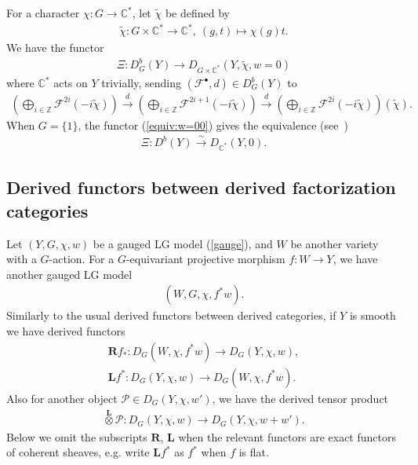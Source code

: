 \documentclass[11pt]{amsart}
\theoremstyle{plain}
\newcommand{\fF}{\mathcal{F}}
\newcommand{\pP}{\mathcal{P}}
\newcommand{\dotimes}{\stackrel{\textbf{L}}{\otimes}}
\newcommand{\dR}{\mathbf{R}}
\newcommand{\dL}{\mathbf{L}}
\begin{document}
For a character $\chi \colon G \to \mathbb{C}^{\ast}$, let 
$\widetilde{\chi}$ be defined by
\begin{align*}
\widetilde{\chi} \colon G \times \mathbb{C}^{\ast} \to \mathbb{C}^{\ast}, \ 
(g, t) \mapsto \chi(g)t.
\end{align*}
We have the functor
\begin{align}\label{equiv:w=00}
\Xi \colon
D_G^b(Y) \to D_{G\times \mathbb{C}^{\ast}}(Y, \widetilde{\chi}, w=0)
\end{align}
where $\mathbb{C}^{\ast}$ acts on $Y$ trivially, 
sending $(\fF^{\bullet}, d) \in D_G^b(Y)$ to 
\begin{align*}
\left(\bigoplus_{i\in \mathbb{Z}}
\fF^{2i}(-i\widetilde{\chi}) \right)
\stackrel{d}{\to}
\left(\bigoplus_{i\in \mathbb{Z}}
\fF^{2i+1}(-i\widetilde{\chi}) \right)
\stackrel{d}{\to}
\left(\bigoplus_{i\in \mathbb{Z}}
\fF^{2i}(-i\widetilde{\chi}) \right)(\widetilde{\chi}).
\end{align*}
When $G=\{1\}$, the functor (\ref{equiv:w=00})
gives the equivalence 
(see~\cite{MR3071664, MR2982435, MR3581302})
\begin{align}\label{equiv:w=0}
\Xi \colon
D^b(Y) \stackrel{\sim}{\to} D_{\mathbb{C}^{\ast}}(Y, 0).
\end{align}



\subsection{Derived functors between derived factorization categories}
Let $(Y, G, \chi, w)$ be a gauged LG model (\ref{gauge}), 
and $W$ be another variety with a $G$-action. 
For a $G$-equivariant projective morphism 
$f \colon W \to Y$, we have another gauged LG model
\begin{align*}
(W, G, \chi, f^{\ast}w).
\end{align*}
Similarly to the usual derived functors between 
derived categories,
if $Y$ is smooth 
we have derived functors
\begin{align*}
\dR f_{\ast} \colon D_G(W, \chi, f^{\ast}w) \to D_G(Y, \chi, w), \\
\dL f^{\ast} \colon D_G(Y, \chi, w) \to D_G(W, \chi, f^{\ast}w).
\end{align*}
Also for another object 
$\pP \in D_G(Y, \chi, w')$, 
we have the derived tensor product
\begin{align*}
\dotimes \pP \colon D_G(Y, \chi, w) \to D_G(Y, \chi, w+w').
\end{align*}
Below we omit the subscripts 
$\dR$, $\dL$ when the relevant 
functors are exact functors of coherent sheaves, e.g. 
write $\dL f^{\ast}$ as $f^{\ast}$ when $f$ is flat. 
\end{document}
